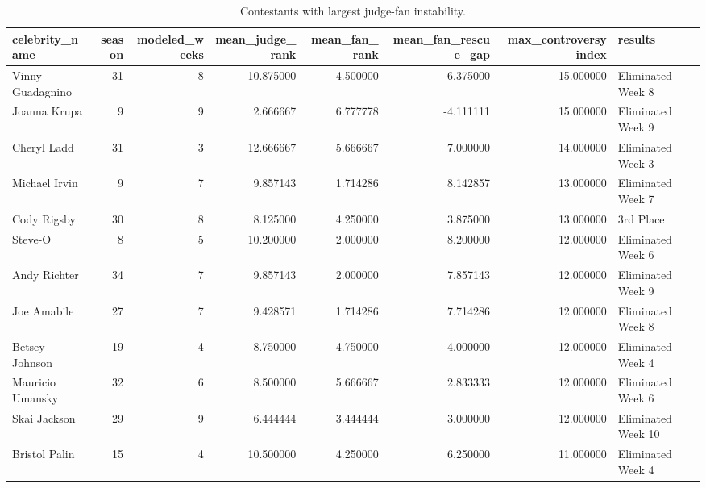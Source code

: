 \begin{table}
\caption{Contestants with largest judge-fan instability.}
\begin{tabular}{lrrrrrrl}
\toprule
celebrity\_name & season & modeled\_weeks & mean\_judge\_rank & mean\_fan\_rank & mean\_fan\_rescue\_gap & max\_controversy\_index & results \\
\midrule
Vinny Guadagnino & 31 & 8 & 10.875000 & 4.500000 & 6.375000 & 15.000000 & Eliminated Week 8 \\
Joanna Krupa & 9 & 9 & 2.666667 & 6.777778 & -4.111111 & 15.000000 & Eliminated Week 9 \\
Cheryl Ladd & 31 & 3 & 12.666667 & 5.666667 & 7.000000 & 14.000000 & Eliminated Week 3 \\
Michael Irvin & 9 & 7 & 9.857143 & 1.714286 & 8.142857 & 13.000000 & Eliminated Week 7 \\
Cody Rigsby & 30 & 8 & 8.125000 & 4.250000 & 3.875000 & 13.000000 & 3rd Place \\
Steve-O & 8 & 5 & 10.200000 & 2.000000 & 8.200000 & 12.000000 & Eliminated Week 6 \\
Andy Richter & 34 & 7 & 9.857143 & 2.000000 & 7.857143 & 12.000000 & Eliminated Week 9 \\
Joe Amabile & 27 & 7 & 9.428571 & 1.714286 & 7.714286 & 12.000000 & Eliminated Week 8 \\
Betsey Johnson & 19 & 4 & 8.750000 & 4.750000 & 4.000000 & 12.000000 & Eliminated Week 4 \\
Mauricio Umansky & 32 & 6 & 8.500000 & 5.666667 & 2.833333 & 12.000000 & Eliminated Week 6 \\
Skai Jackson & 29 & 9 & 6.444444 & 3.444444 & 3.000000 & 12.000000 & Eliminated Week 10 \\
Bristol Palin & 15 & 4 & 10.500000 & 4.250000 & 6.250000 & 11.000000 & Eliminated Week 4 \\
\bottomrule
\end{tabular}
\end{table}
